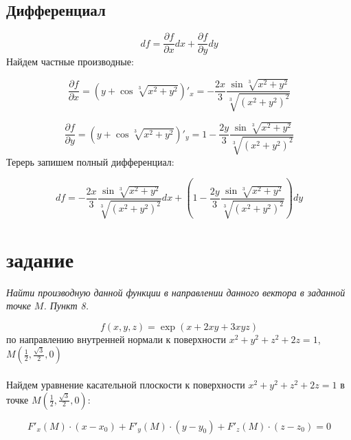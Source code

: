 \documentclass[a5paper, 10pt]{article}
\theoremstyle{definition}
\theoremstyle{plain}
\theoremstyle{remark}
\begin{document}
\subsection{Дифференциал}

\begin{equation}
df = \frac{\partial f}{\partial x} dx + \frac{\partial f}{\partial y} dy
\end{equation}
Найдем частные производные:

\begin{equation}
\frac{\partial f}{\partial x} = \left( y + \cos \sqrt[3]{x^2 + y^2} \right)'_x = -\frac{2x}{3} \frac{\sin \sqrt[3]{x^2 + y^2}}{\sqrt[3]{ \left( x^2 + y^2 \right)^2}}
\end{equation}

\begin{equation}
\frac{\partial f}{\partial y} = \left( y + \cos \sqrt[3]{x^2 + y^2} \right)'_y = 1 -\frac{2y}{3} \frac{\sin \sqrt[3]{x^2 + y^2}}{\sqrt[3]{ \left( x^2 + y^2 \right)^2}}
\end{equation}
Терерь запишем полный дифференциал:

\begin{equation}
df =  -\frac{2x}{3} \frac{\sin \sqrt[3]{x^2 + y^2}}{\sqrt[3]{ \left( x^2 + y^2 \right)^2}} dx + \left( 1 -\frac{2y}{3} \frac{\sin \sqrt[3]{x^2 + y^2}}{\sqrt[3]{ \left( x^2 + y^2 \right)^2}}  \right) dy
\end{equation}

\newpage

\section{задание}
\textit{Найти производную данной функции в направлении данного вектора в заданной точке $M$. Пункт 8.}

\begin{equation}
f(x, y, z) = \exp(x + 2xy + 3xyz)
\end{equation}
по направлению внутренней нормали к поверхности $x^2 + y^2 + z^2 + 2z = 1$, $M \left( \frac{1}{2}, \frac{\sqrt{3}}{2}, 0 \right)$\\
\\
Найдем уравнение касательной плоскости к поверхности $x^2 + y^2 + z^2 + 2z = 1$ в точке $M \left( \frac{1}{2}, \frac{\sqrt{3}}{2}, 0 \right)$:

\begin{equation}
F'_x \left( M \right) \cdot (x - x_0) + F'_y \left( M \right) \cdot (y - y_0) + F'_z \left( M \right) \cdot (z - z_0) = 0
\end{equation}
\end{document}
